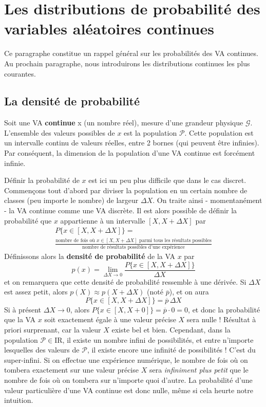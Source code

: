 \documentclass[main.tex]{subfiles}
\begin{document}
\section{Les distributions de probabilité des variables aléatoires continues}

Ce paragraphe constitue un rappel général sur les probabilités des VA continues. Au prochain paragraphe, nous introduirons les distributions continues les plus courantes.

\subsection{La densité de probabilité}

Soit une VA \textbf{continue} x (un nombre réel), mesure d'une grandeur physique $\mathcal{G}$. L'ensemble des valeurs possibles de $x$ est la population $\mathcal{P}$. Cette population est un intervalle continu de valeurs réelles, entre 2 bornes (qui peuvent être infinies). Par conséquent, la dimension de la population d'une VA continue est forcément infinie.

Définir la probabilité de $x$ est ici un peu plus difficile que dans le cas discret. Commençons tout d'abord par diviser la population en un certain nombre de classes (peu importe le nombre) de largeur $\Delta X$. On traite ainsi - momentanément - la VA continue comme une VA discrète. Il est alors possible de définir la probabilité que $x$ appartienne à un intervalle $[X,X+\Delta X]$ par
\begin{multline}
    P\{x\in[X,X+\Delta X]\}=\\
    \frac{\text{nombre de fois où $x\in[X,X+\Delta X]$ parmi tous les résultats possibles}}{\text{nombre de résultats possibles d'une expérience}}
    \label{eq:ddlppuvac}
\end{multline}
Définissons alors la \textbf{densité de probabilité} de la VA $x$ par
\begin{equation}
    p(x)=\lim_{\Delta X\rightarrow 0}\frac{P\{x\in[X,X+\Delta X]\}}{\Delta X}
\end{equation}
et on remarquera que cette densité de probabilité ressemble à une dérivée. Si $\Delta X$ est assez petit, alors $p(X)\approx p(X\!+\!\Delta X)$ (noté $\overline{p}$), et on aura
\begin{equation*}
    P\{x\in[X,X+\Delta X]\}=\overline{p}\,\Delta X
\end{equation*}
Si à présent $\Delta X\rightarrow0$, alors $P\{x\in[X,X+0]\}=\overline{p}\cdot 0=0$, et donc la probabilité que la VA $x$ soit exactement égale à une valeur précise $X$ sera nulle ! Résultat à priori surprenant, car la valeur $X$ existe bel et bien. Cependant, dans la population $\mathcal{P}\in\text{I}\!\text{R}$, il existe un nombre infini de possibilités, et entre n'importe lesquelles des valeurs de $\mathcal{P}$, il existe encore une infinité de possibilités ! C'est du super-infini. Si on effectue une expérience numérique, le nombre de fois où on tombera exactement sur une valeur précise $X$ sera \textit{infiniment plus petit} que le nombre de fois où on tombera sur n'importe quoi d'autre. La probabilité d'une valeur particulière d'une VA continue est donc nulle, même si cela heurte notre intuition.
\end{document}
